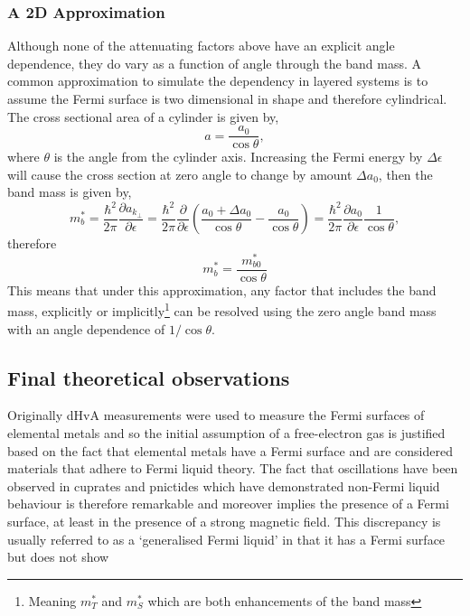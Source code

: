 \subsubsection{A 2D Approximation}

Although none of the attenuating factors above have an explicit angle dependence, they do vary as a function of angle through the band mass. A common approximation to simulate the dependency in layered systems is to assume the Fermi surface is two dimensional in shape and therefore cylindrical. The cross sectional area of a cylinder is given by,
\begin{equation}
    a = \frac{a_0}{\cos \theta},
\end{equation}
where $\theta$ is the angle from the cylinder axis. Increasing the Fermi energy by $\Delta \epsilon$ will cause the cross section at zero angle to change by amount $\Delta a_0$, then the band mass is given by,
\begin{equation}
    m^*_b = \frac{\hbar^2}{2\pi}\frac{\partial a_{k_\perp}}{\partial \epsilon} = \frac{\hbar^2}{2\pi}\frac{\partial}{\partial \epsilon}\left(\frac{a_0 + \Delta a_0 }{\cos\theta} - \frac{a_0 }{\cos\theta}\right) = \frac{\hbar^2}{2\pi}\frac{\partial a_0}{\partial \epsilon}\frac{1}{\cos \theta},
\end{equation}
therefore
\begin{equation}
    m^*_b = \frac{m^*_{b0} }{\cos{\theta}}
\end{equation}
This means that under this approximation, any factor that includes the band mass, explicitly or implicitly\footnote{Meaning $m^*_T$ and $m^*_S$ which are both enhancements of the band mass} can be resolved using the zero angle band mass with an angle dependence of $1/\cos{\theta}$.

\subsection{Final theoretical observations}

Originally \ac{dHvA} measurements were used to measure the Fermi surfaces of elemental metals and so the initial assumption of a free-electron gas is justified based on the fact that elemental metals have a Fermi surface and are considered materials that adhere to Fermi liquid theory. The fact that oscillations have been observed in cuprates and pnictides which have demonstrated non-Fermi liquid behaviour is therefore remarkable and moreover implies the presence of a Fermi surface, at least in the presence of a strong magnetic field. This discrepancy is usually referred to as a `generalised Fermi liquid' in that it has a Fermi surface but does not show 

